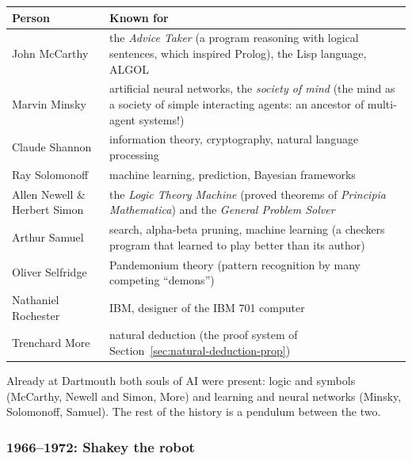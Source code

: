 \begin{center}
\small
\begin{tabularx}{\linewidth}{@{}l X@{}}
\toprule
\textbf{Person} & \textbf{Known for} \\
\midrule
John McCarthy & the \emph{Advice Taker} (a program reasoning with logical sentences, which
                inspired Prolog), the Lisp language, ALGOL \\
Marvin Minsky & artificial neural networks, the \emph{society of mind} (the mind as a
                society of simple interacting agents: an ancestor of multi-agent systems!) \\
Claude Shannon & information theory, cryptography, natural language processing \\
Ray Solomonoff & machine learning, prediction, Bayesian frameworks \\
Allen Newell \& Herbert Simon & the \emph{Logic Theory Machine} (proved theorems of
                \emph{Principia Mathematica}) and the \emph{General Problem Solver} \\
Arthur Samuel & search, alpha-beta pruning, machine learning (a checkers program that
                learned to play better than its author) \\
\midrule
Oliver Selfridge & Pandemonium theory (pattern recognition by many competing ``demons'') \\
Nathaniel Rochester & IBM, designer of the IBM 701 computer \\
Trenchard More & natural deduction (the proof system of Section~\ref{sec:natural-deduction-prop}) \\
\bottomrule
\end{tabularx}
\end{center}

\begin{nbintuition}
Already at Dartmouth both souls of AI were present: logic and symbols (McCarthy, Newell and
Simon, More) and learning and neural networks (Minsky, Solomonoff, Samuel). The rest of the
history is a pendulum between the two.
\end{nbintuition}

\subsubsection{1966--1972: Shakey the robot}

